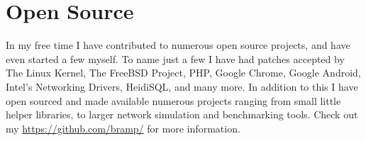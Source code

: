 \documentclass[letterpaper,10pt]{article}
\begin{document}
\begin{tabularx}{\textwidth}{r|X}


\end{tabularx}


\section{Open Source}
 In my free time I have contributed to numerous open source projects, and have even started a few myself. To name just a few I have had patches accepted by 
The Linux Kernel, The FreeBSD Project, PHP, Google Chrome, Google Android, Intel's Networking Drivers, HeidiSQL, and many more. In addition to this I have open sourced and made 
available numerous projects ranging from small little helper libraries, to larger network simulation and benchmarking tools. Check out my \href{https://github.com/bramp/}{https://github.com/bramp/} for more information.


\end{document}
